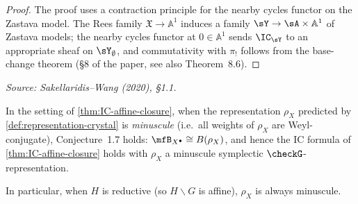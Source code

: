 \begin{proof}
  The proof uses a contraction principle for the nearby cycles functor on the Zastava model.
  The Rees family \( \mathfrak{X} \to \mathbb{A}^1 \) induces a family
  \( \sY \to \sA \times \mathbb{A}^1 \) of Zastava models; the nearby cycles functor at
  \( 0 \in \mathbb{A}^1 \) sends \( \IC_{\sY} \) to an appropriate sheaf on
  \( \sY_\emptyset \), and commutativity with \( \pi_! \) follows from the
  base-change theorem (§8 of the paper, see also Theorem~8.6).
\end{proof}

\begin{corollary}
  \label{cor:minuscule}
  \textit{Source: Sakellaridis--Wang (2020), §1.1.}

  In the setting of \cref{thm:IC-affine-closure}, when the representation \( \rho_X \)
  predicted by \cref{def:representation-crystal} is \emph{minuscule}
  (i.e.\ all weights of \( \rho_X \) are Weyl-conjugate), Conjecture~1.7 holds:
  \( \mfB_{X^\bullet} \cong B(\rho_X) \), and hence the IC formula of
  \cref{thm:IC-affine-closure} holds with \( \rho_X \) a minuscule symplectic
  \( \checkG \)-representation.

  In particular, when \( H \) is reductive (so \( H \backslash G \) is affine),
  \( \rho_X \) is always minuscule.
\end{corollary}

